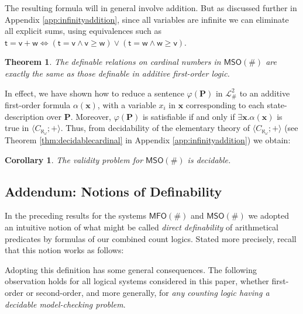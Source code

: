 \documentclass[12pt,oneside,reqno]{amsart}
\newtheorem{corollary}{Corollary}
\newtheorem{theorem}{Theorem}
\theoremstyle{definition}
\begin{document}
The resulting formula will in general involve addition. But as discussed further in Appendix \ref{app:infinityaddition}, since all variables are infinite we can eliminate all explicit sums, using equivalences such as $\mathsf{t} = \mathsf{v}+\mathsf{w} \Leftrightarrow  (\mathsf{t}=\mathsf{v} \wedge \mathsf{v} \geq \mathsf{w})\vee (\mathsf{t}=\mathsf{w} \wedge \mathsf{w} \geq \mathsf{v}) $.



\begin{theorem} The definable relations on cardinal numbers in $\mathsf{MSO}(\#)$ are exactly the same as those definable in additive first-order logic. 
\end{theorem}
In effect, we have shown how to reduce a sentence $\varphi(\mathbf{P})$ in $\mathcal{L}_\#^2$ to an additive first-order formula $\alpha(\mathbf{x})$, with a variable $x_i$ in $\mathbf{x}$ corresponding to each state-description over $\mathbf{P}$. Moreover, $\varphi(\mathbf{P})$ is satisfiable if and only if $\exists \mathbf{x}.\alpha(\mathbf{x})$ is true in $\langle C_{\aleph_\omega};+ \rangle$. Thus, from decidability of the elementary theory of $\langle C_{\aleph_\omega};+ \rangle$ (see Theorem \ref{thm:decidablecardinal} in Appendix \ref{app:infinityaddition}) we obtain: 
\begin{corollary} \label{cor:mso} The validity problem for $\mathsf{MSO}(\#)$ is decidable.\vspace{-1ex}
\end{corollary}

\vspace{0.5ex}

\subsection{Addendum: Notions of Definability}\label{twodefinitions} In the preceding results for the systems $\mathsf{MFO}(\#)$ and $\mathsf{MSO}(\#)$ we adopted an intuitive notion of what might be called \emph{direct definability} of arithmetical predicates by formulas of our combined count logics. Stated more precisely, recall that this notion works as follows:


 
Adopting this definition has some general consequences. The following observation holds for all logical systems considered in this paper, whether first-order or second-order, and more generally, for \emph{any counting logic having a decidable model-checking problem}. 
\end{document}
